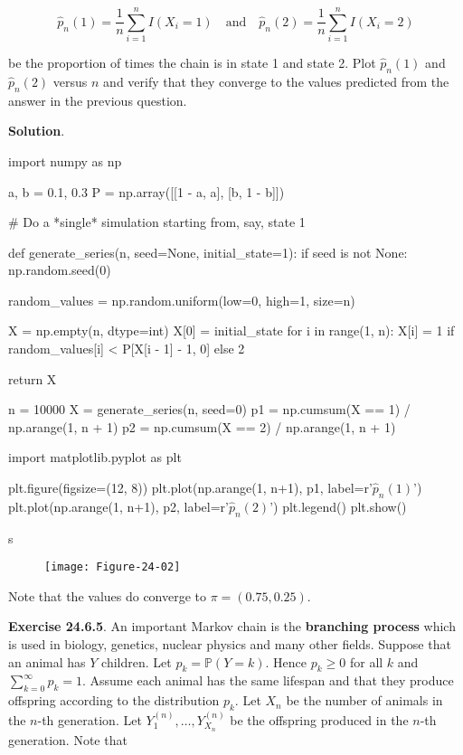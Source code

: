 \[
\hat{p}_{n}(1) = \frac{1}{n} \sum_{i=1}^{n} I(X_{i} = 1)
\quad \text{and} \quad
\hat{p}_{n}(2) = \frac{1}{n} \sum_{i=1}^{n} I(X_{i} = 2)
\]

be the proportion of times the chain is in state 1 and state 2. Plot
\(\hat{p}_{n}(1)\) and \(\hat{p}_{n}(2)\) versus \(n\) and verify that they
converge to the values predicted from the answer in the previous
question.

\textbf{Solution}.

\begin{python}
import numpy as np

a, b = 0.1, 0.3
P = np.array([[1 - a, a], [b, 1 - b]])
\end{python}

\begin{python}
# Do a *single* simulation starting from, say, state 1

def generate_series(n, seed=None, initial_state=1):
    if seed is not None:
        np.random.seed(0)

    random_values = np.random.uniform(low=0, high=1, size=n)

    X = np.empty(n, dtype=int)
    X[0] = initial_state
    for i in range(1, n):
        X[i] = 1 if random_values[i] < P[X[i - 1] - 1, 0] else 2
        
    return X

n = 10000
X = generate_series(n, seed=0)
p1 = np.cumsum(X == 1) / np.arange(1, n + 1)
p2 = np.cumsum(X == 2) / np.arange(1, n + 1)
\end{python}

\begin{python}
import matplotlib.pyplot as plt

plt.figure(figsize=(12, 8))
plt.plot(np.arange(1, n+1), p1, label=r'$\hat{p}_{n}(1)$')
plt.plot(np.arange(1, n+1), p2, label=r'$\hat{p}_{n}(2)$')
plt.legend()
plt.show()
\end{python}s

\begin{figure}[H]
\centering
\texttt{[image: Figure-24-02]}
\end{figure}

Note that the values do converge to \(\pi = (0.75, 0.25)\).

\textbf{Exercise 24.6.5}. An important Markov chain is the
\textbf{branching process} which is used in biology, genetics, nuclear
physics and many other fields. Suppose that an animal has \(Y\)
children. Let \(p_{k} = \mathbb{P}(Y = k)\). Hence \(p_{k} \geq 0\) for all
\(k\) and \(\sum_{k = 0}^{\infty} p_{k} = 1\). Assume each animal has the
same lifespan and that they produce offspring according to the
distribution \(p_{k}\). Let \(X_{n}\) be the number of animals in the
\(n\)-th generation. Let \(Y_{1}^{(n)}, \dots, Y_{X_{n}}^{(n)}\) be the
offspring produced in the \(n\)-th generation. Note that

